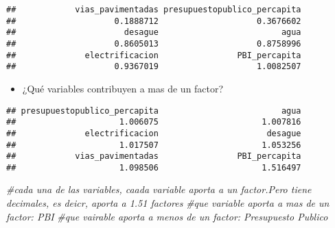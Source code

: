 \documentclass[
]{article}
\newenvironment{Shaded}{\begin{snugshade}}{\end{snugshade}}
\newcommand{\CommentTok}[1]{\textcolor[rgb]{0.56,0.35,0.01}{\textit{#1}}}
\newcommand{\KeywordTok}[1]{\textcolor[rgb]{0.13,0.29,0.53}{\textbf{#1}}}
\newcommand{\NormalTok}[1]{#1}
\newcommand{\OperatorTok}[1]{\textcolor[rgb]{0.81,0.36,0.00}{\textbf{#1}}}
\providecommand{\tightlist}{%
  \setlength{\itemsep}{0pt}\setlength{\parskip}{0pt}}
\begin{document}
\begin{Shaded}
\end{Shaded}

\begin{verbatim}
##            vias_pavimentadas presupuestopublico_percapita 
##                    0.1888712                    0.3676602 
##                      desague                         agua 
##                    0.8605013                    0.8758996 
##              electrificacion                PBI_percapita 
##                    0.9367019                    1.0082507
\end{verbatim}

\begin{itemize}
\tightlist
\item
  ¿Qué variables contribuyen a mas de un factor?
\end{itemize}

\begin{Shaded}
\end{Shaded}

\begin{verbatim}
## presupuestopublico_percapita                         agua 
##                     1.006075                     1.007816 
##              electrificacion                      desague 
##                     1.017507                     1.053256 
##            vias_pavimentadas                PBI_percapita 
##                     1.098506                     1.516497
\end{verbatim}

\begin{Shaded}
\begin{Highlighting}[]
\CommentTok{#cada una de las variables, caada variable aporta a un factor.Pero tiene decimales, es deicr, aporta a 1.51 factores}
\CommentTok{#que variable aporta a mas de un factor: PBI}
\CommentTok{#que vairable aporta a menos de un factor: Presupuesto Publico}
\end{Highlighting}
\end{Shaded}
\end{document}
